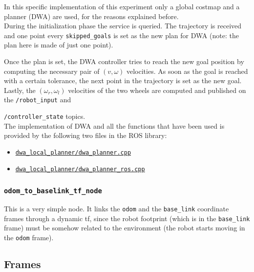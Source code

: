 \documentclass[11pt,a4paper]{article}
\begin{document}
In this specific implementation of this experiment only a global costmap and a planner (DWA) are used,
for the reasons explained before.\\

During the initialization phase the service is queried.
The trajectory is received and one point every \texttt{skipped\_goals} is set as the new plan for DWA
(note: the plan here is made of just one point).

Once the plan is set, the DWA controller tries to reach the new goal position by computing the necessary
pair of $(v, \omega)$ velocities. As soon as the goal is reached with a certain tolerance, the next point
in the trajectory is set as the new goal.\\

Lastly, the $(\omega_r,\omega_l)$ velocities of the two wheels are computed and published on the
\texttt{/robot\_input} and

\texttt{/controller\_state} topics.\\

The implementation of DWA and all the functions that have been used is provided by the following
two files in the ROS library:
\begin{itemize}
    \item \href{https://docs.ros.org/en/melodic/api/dwa\_local\_planner/html/dwa\_\_planner\_8cpp\_source.html}
            {\texttt{dwa\_local\_planner/dwa\_planner.cpp}}
    \item \href{https://docs.ros.org/en/melodic/api/dwa\_local\_planner/html/dwa\_\_planner\_\_ros\_8cpp\_source.html}
            {\texttt{dwa\_local\_planner/dwa\_planner\_ros.cpp}}
\end{itemize}

\subsubsection{\texttt{odom\_to\_baselink\_tf\_node}}

This is a very simple node. It links the \texttt{odom} and the \texttt{base\_link}
coordinate frames through a dynamic tf, since the robot footprint (which is in the \texttt{base\_link}
frame) must be somehow related to the environment (the robot starts moving in the \texttt{odom} frame).



\subsection{Frames}
\end{document}
